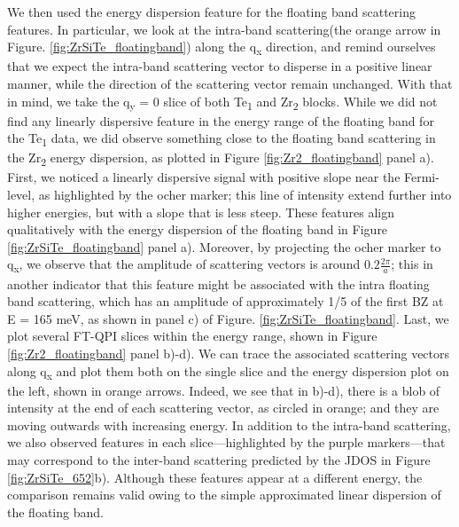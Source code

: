 We then used the energy dispersion feature for the floating band scattering features. In particular, we look at the intra-band scattering(the orange arrow in Figure. \ref{fig:ZrSiTe_floatingband}) along the q\textsubscript{x} direction, and remind ourselves that we expect the intra-band scattering vector to disperse in a positive linear manner, while the direction of the scattering vector remain unchanged. With that in mind, we take the q\textsubscript{y} = 0 slice of both Te\textsubscript{1} and Zr\textsubscript{2} blocks. While we did not find any linearly dispersive feature in the energy range of the floating band for the Te\textsubscript{1} data, we did observe something close to the floating band scattering in the Zr\textsubscript{2} energy dispersion, as plotted in Figure \ref{fig:Zr2_floatingband} panel a). First, we noticed a linearly dispersive signal with positive slope near the Fermi-level, as highlighted by the ocher marker; this line of intensity extend further into higher energies, but with a slope that is less steep. These features align qualitatively with the energy dispersion of the floating band in Figure \ref{fig:ZrSiTe_floatingband} panel a). Moreover, by projecting the ocher marker to q\textsubscript{x}, we observe that the amplitude of scattering vectors is around $0.2 \frac{2\pi}{a}$; this in another indicator that this feature might be associated with the intra floating band scattering, which has an amplitude of approximately 1/5 of the first \ac{BZ} at E = 165 meV, as shown in panel c) of Figure. \ref{fig:ZrSiTe_floatingband}. Last, we plot several FT-QPI slices within the energy range, shown in Figure \ref{fig:Zr2_floatingband} panel b)-d). We can trace the associated scattering vectors along q\textsubscript{x} and plot them both on the single slice and the energy dispersion plot on the left, shown in orange arrows. Indeed, we see that in b)-d), there is a blob of intensity at the end of each scattering vector, as circled in orange; and they are moving outwards with increasing energy. In addition to the intra-band scattering, we also observed features in each slice—highlighted by the purple markers—that may correspond to the inter-band scattering predicted by the \ac{JDOS} in Figure \ref{fig:ZrSiTe_652}b). Although these features appear at a different energy, the comparison remains valid owing to the simple approximated linear dispersion of the floating band. 



